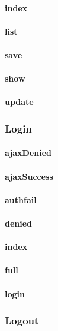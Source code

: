 \documentclass[12pt]{article}
\begin{document}
\paragraph{index}
\paragraph{list}
\paragraph{save}
\paragraph{show}
\paragraph{update}

\subsubsection{Login}\label{sec:CLogin}
\paragraph{ajaxDenied}
\paragraph{ajaxSuccess}
\paragraph{authfail}
\paragraph{denied}
\paragraph{index}
\paragraph{full}
\paragraph{login}

\subsubsection{Logout}\label{sec:CLogout}
\end{document}

